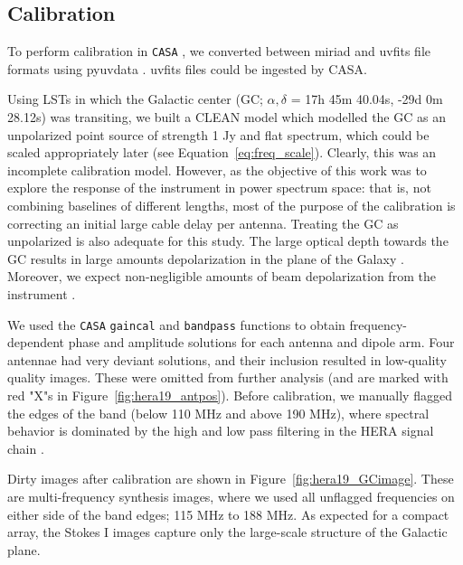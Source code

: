 \subsection{Calibration}
\label{subsec:hera19_cal}
To perform calibration in {\tt CASA} \citep{casa}, we converted between {\sc miriad} and {\sc uvfits} file formats using {\sc pyuvdata} \citep{pyuvdata}. {\sc uvfits} files could be ingested by {\sc CASA}.

Using LSTs in which the Galactic center (GC; $\alpha, \delta$ = 17h 45m 40.04s,​ ​-29d 0m 28.12s) was transiting, we built a CLEAN model which modelled the GC as an unpolarized point source of strength 1 Jy and flat spectrum, which could be scaled appropriately later (see Equation~\ref{eq:freq_scale}). Clearly, this was an incomplete calibration model. However, as the objective of this work was to explore the response of the instrument in power spectrum space: that is, not combining baselines of different lengths, most of the purpose of the calibration is correcting an initial large cable delay per antenna. Treating the GC as unpolarized is also adequate for this study. The large optical depth towards the GC \citep{Oppermann.12} results in large amounts depolarization in the plane of the Galaxy \citep{Wolleben.06}. Moreover, we expect non-negligible amounts of beam depolarization from the instrument \citep{Neben.16}.

We used the {\tt CASA} {\tt gaincal} and {\tt bandpass} functions to obtain frequency-dependent phase and amplitude solutions for each antenna and dipole arm. Four antennae had very deviant solutions, and their inclusion resulted in low-quality quality images. These were omitted from further analysis (and are marked with red "X"s in Figure~\ref{fig:hera19_antpos}).  Before calibration, we manually flagged the edges of the band (below 110 MHz and above 190 MHz), where spectral behavior is dominated by the high and low pass filtering in the HERA signal chain \citep{deBoer.17}.

Dirty images after calibration are shown in Figure~\ref{fig:hera19_GCimage}. These are multi-frequency synthesis images, where we used all unflagged frequencies on either side of the band edges; 115 MHz to 188 MHz. As expected for a compact array, the Stokes I images capture only the large-scale structure of the Galactic plane. 

